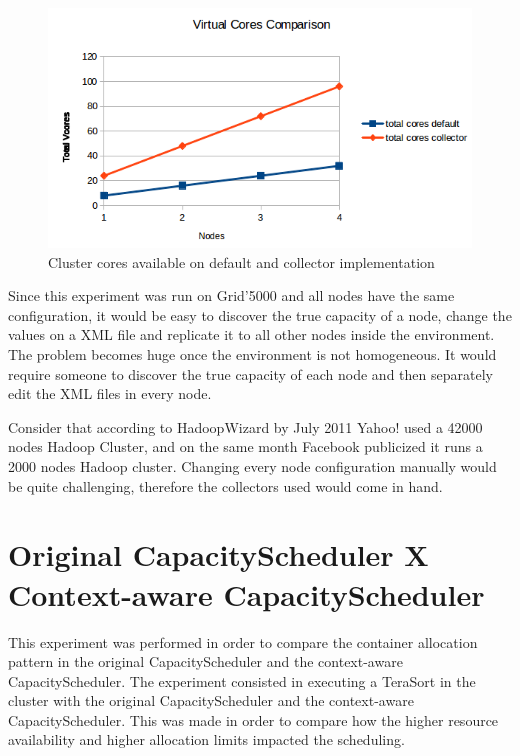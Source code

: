 \begin{figure}[!hbtn]
   \renewcommand{\figurename}{Figure}
   \centering
   \includegraphics[width=15cm]{figuras/Figura12-totalCores.png}
   \caption{Cluster cores available on default and collector implementation}
   \label{fig:experiment3}
\end{figure}

Since this experiment was run on Grid'5000 and all nodes have the same configuration, it would be easy to discover the true capacity of a node, change the values on a XML file and replicate it to all other nodes inside the environment. The problem becomes huge once the environment is not homogeneous. It would require someone to discover the true capacity of each node and then separately edit the XML files in every node.

Consider that according to HadoopWizard \cite{HadoopWizard} by July 2011 Yahoo! used a 42000 nodes Hadoop Cluster, and on the same month Facebook publicized it runs a 2000 nodes Hadoop cluster. Changing every node configuration manually would be quite challenging, therefore the collectors used would come in hand.

\section{Original CapacityScheduler X Context-aware CapacityScheduler}
This experiment was performed in order to compare the container allocation pattern in the original CapacityScheduler and the context-aware CapacityScheduler. The experiment consisted in executing a TeraSort in the cluster with the original CapacityScheduler and the context-aware CapacityScheduler. This was made in order to compare how the higher resource availability and higher allocation limits impacted the scheduling.

